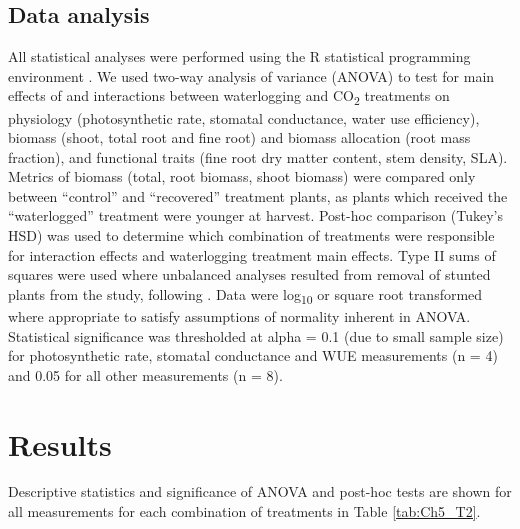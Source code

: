 \documentclass[12pt,a4paper]{memoir}
\begin{document}
\subsection{Data analysis}
All statistical analyses were performed using the R statistical programming environment  \citep{RCoreTeam2015}. We used two-way analysis of variance (ANOVA) to test for main effects of and interactions between waterlogging and CO\textsubscript{2} treatments on physiology (photosynthetic rate, stomatal conductance, water use efficiency), biomass (shoot, total root and fine root) and biomass allocation (root mass fraction), and functional traits (fine root dry matter content, stem density, SLA). Metrics of biomass (total, root biomass, shoot biomass) were compared only between “control” and “recovered” treatment plants, as plants which received the “waterlogged” treatment were younger at harvest. Post-hoc comparison (Tukey’s HSD) was used to determine which combination of treatments were responsible for interaction effects and waterlogging treatment main effects. Type II sums of squares were used where unbalanced analyses resulted from removal of stunted plants from the study, following \citet{Langsrud2003}. Data were log\textsubscript{10} or square root transformed where appropriate to satisfy assumptions of normality inherent in ANOVA. Statistical significance was thresholded at alpha = 0.1 (due to small sample size) for photosynthetic rate, stomatal conductance and WUE measurements (n = 4) and 0.05 for all other measurements (n = 8).

\section{Results}
Descriptive statistics and significance of ANOVA and post-hoc tests are shown for all measurements for each combination of treatments in Table \ref{tab:Ch5_T2}. 
\end{document}
